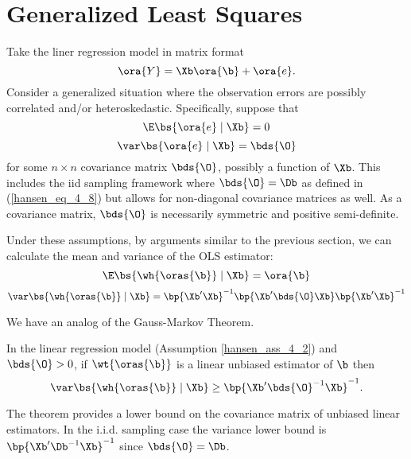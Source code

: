 \section{Generalized Least Squares}

Take the liner regression model in matrix format
\begin{equation}
    \label{hansen_eq_4_12}
    \ora{Y} = \Xb \ora{\b} + \ora{e}.
\end{equation}
Consider a generalized situation where the observation errors are possibly correlated and/or heteroskedastic. Specifically, suppose that
\begin{equation}
    \E\bs{\ora{e} \mid \Xb} = 0
\end{equation}
\begin{equation}
    \var\bs{\ora{e} \mid \Xb} = \bds{\O}
\end{equation}
for some $n \times n$ covariance matrix $\bds{\O}$, possibly a function of $\Xb$. This includes the iid sampling framework where $\bds{\O} = \Db$ as defined in (\ref{hansen_eq_4_8}) but allows for non-diagonal covariance matrices as well. As a covariance matrix, $\bds{\O}$ is necessarily symmetric and positive semi-definite.

Under these assumptions, by arguments similar to the previous section, we can calculate the mean and variance of the OLS estimator:
\begin{equation}
    \E\bs{\wh{\oras{\b}} \mid \Xb} = \ora{\b}
\end{equation}
\begin{equation} 
    \label{hansen_eq_4_16}
    \var\bs{\wh{\oras{\b}} \mid \Xb} = \bp{\Xb^\prime \Xb}^{-1} \bp{\Xb^\prime \bds{\O} \Xb} \bp{\Xb^\prime \Xb}^{-1}
\end{equation}

We have an analog of the Gauss-Markov Theorem.
\begin{theorem} 
    \label{hansen_thm_4_6}

    In the linear regression model (Assumption \ref{hansen_ass_4_2}) and $\bds{\O} > 0$, if $\wt{\oras{\b}}$ is a linear unbiased estimator of $\b$ then
    $$\var\bs{\wh{\oras{\b}} \mid \Xb} \geq \bp{\Xb^\prime \bds{\O}^{-1} \Xb}^{-1}.$$
\end{theorem}

The theorem provides a lower bound on the covariance matrix of unbiased linear estimators.  In the i.i.d. sampling case the variance lower bound is $\bp{\Xb^\prime {\Db}^{-1} \Xb}^{-1}$ since $\bds{\O} = \Db$.

